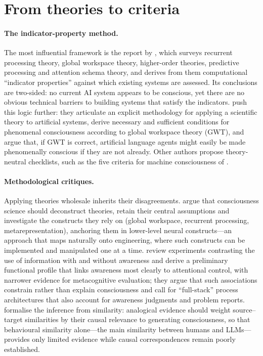 \documentclass[11pt,a4paper]{article}
\begin{document}
\section{From theories to criteria}
\label{sec:method}

\paragraph{The indicator-property method.} The most influential framework is
the report by \citet{butlin2023consciousness}, which surveys recurrent
processing theory, global workspace theory, higher-order theories, predictive
processing and attention schema theory, and derives from them computational
``indicator properties'' against which existing systems are assessed. Its
conclusions are two-sided: no current AI system appears to be conscious, yet
there are no obvious technical barriers to building systems that satisfy the
indicators. \citet{goldstein2024case} push this logic further: they articulate
an explicit methodology for applying a scientific theory to artificial systems,
derive necessary and sufficient conditions for phenomenal consciousness
according to global workspace theory (GWT), and argue that, if GWT is correct,
artificial language agents might easily be made phenomenally conscious if they
are not already. Other authors propose theory-neutral checklists, such as the
five criteria for machine consciousness of \citet{anwar2024machine}.

\paragraph{Methodological critiques.} Applying theories wholesale inherits
their disagreements. \citet{fazekas2024construct} argue that consciousness
science should deconstruct theories, retain their central assumptions and
investigate the constructs they rely on (global workspace, recurrent
processing, metarepresentation), anchoring them in lower-level neural
constructs---an approach that maps naturally onto engineering, where such
constructs can be implemented and manipulated one at a time.
\citet{thorat2026full} review experiments contrasting the use of information
with and without awareness and derive a preliminary functional profile that
links awareness most clearly to attentional control, with narrower evidence for
metacognitive evaluation; they argue that such associations constrain rather
than explain consciousness and call for ``full-stack'' process architectures
that also account for awareness judgments and problem reports.
\citet{holyoak2026analogy} formalise the inference from similarity: analogical
evidence should weight source--target similarities by their causal relevance
to generating consciousness, so that behavioural similarity alone---the main
similarity between humans and LLMs---provides only limited evidence while
causal correspondences remain poorly established.
\end{document}
